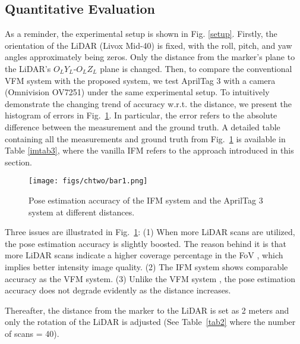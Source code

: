 \subsection{Quantitative Evaluation}
As a reminder, the experimental setup is shown in Fig. \ref{setup}. Firstly, the orientation of the LiDAR (Livox Mid-40) is fixed, with the roll, pitch, and yaw angles approximately being zeros. Only the distance from the marker's plane to the LiDAR's $O_{L}Y_{L}\mbox{-}O_{L}Z_{L}$ plane is changed. Then, to compare the conventional VFM system with the proposed system, we test AprilTag 3 \cite{ap3} with a camera (Omnivision OV7251) under the same experimental setup. To intuitively demonstrate the changing trend of accuracy w.r.t. the distance, we present the histogram of errors in Fig.~\ref{bar1}. In particular, the error refers to the absolute difference between the measurement and the ground truth. 
A detailed table containing all the measurements and ground truth from Fig.~\ref{bar1} is available in Table \ref{imtab3}, where the vanilla IFM refers to the approach introduced in this section.
\begin{figure}[H] 
	\centering
	\texttt{[image: figs/chtwo/bar1.png]}
	\caption{Pose estimation accuracy of the IFM system and the AprilTag 3 system at different distances.}
	\label{bar1}
\end{figure}
Three issues are illustrated in Fig.~\ref{bar1}: (1) When more LiDAR scans are utilized, the pose estimation accuracy is slightly boosted. The reason behind it is that more LiDAR scans indicate a higher coverage percentage in the FoV \cite{loam}, which implies better intensity image quality. (2) The IFM system shows comparable accuracy as the VFM system. (3) Unlike the VFM system \cite{wang,olson,ap3}, the pose estimation accuracy does not degrade evidently as the distance increases.
\par
Thereafter, the distance from the marker to the LiDAR is set as 2 meters and only the rotation of the LiDAR is adjusted (See Table~\ref{tab2} where the number of scans = 40). 
